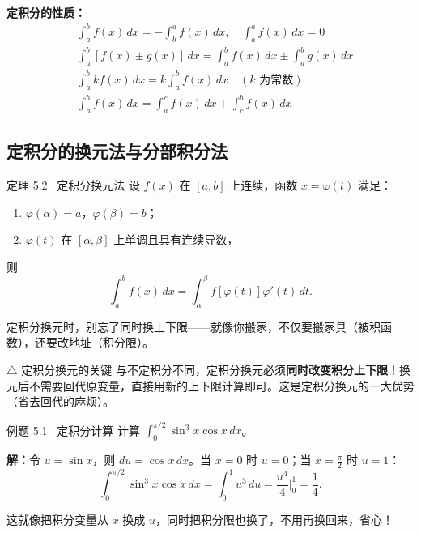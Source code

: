 \documentclass[12pt,a4paper]{article}
\newcommand{\redtext}[1]{{\color{MainRed}\textbf{#1}}}
\newcommand{\humor}[1]{\par\smallskip\begin{humorbox}#1\end{humorbox}\smallskip}
\begin{document}
\begin{formulaframe}
\centering
\textbf{定积分的性质：}
\[
\begin{aligned}
&\int_a^b f(x)\,dx = -\int_b^a f(x)\,dx, \quad \int_a^a f(x)\,dx = 0 \\[6pt]
&\int_a^b [f(x) \pm g(x)]\,dx = \int_a^b f(x)\,dx \pm \int_a^b g(x)\,dx \\[6pt]
&\int_a^b kf(x)\,dx = k\int_a^b f(x)\,dx \quad (k\text{ 为常数}) \\[6pt]
&\int_a^b f(x)\,dx = \int_a^c f(x)\,dx + \int_c^b f(x)\,dx
\end{aligned}
\]
\end{formulaframe}

\subsection{定积分的换元法与分部积分法}

\begin{thmbox}{定理 5.2 \ 定积分换元法}
设 $f(x)$ 在 $[a,b]$ 上连续，函数 $x = \varphi(t)$ 满足：
\begin{enumerate}[leftmargin=2em, itemsep=2pt]
  \item $\varphi(\alpha) = a$，$\varphi(\beta) = b$；
  \item $\varphi(t)$ 在 $[\alpha, \beta]$ 上单调且具有连续导数，
\end{enumerate}
则
\[
\int_a^b f(x)\,dx = \int_\alpha^\beta f[\varphi(t)]\varphi'(t)\,dt.
\]
\end{thmbox}
\humor{定积分换元时，别忘了同时换上下限——就像你搬家，不仅要搬家具（被积函数），还要改地址（积分限）。}

\begin{warnbox}{$\triangle$ 定积分换元的关键}
与不定积分不同，定积分换元必须\redtext{同时改变积分上下限}！换元后不需要回代原变量，直接用新的上下限计算即可。这是定积分换元的一大优势（省去回代的麻烦）。
\end{warnbox}

\begin{exbox}{例题 5.1 \ 定积分计算}
计算 $\displaystyle\int_0^{\pi/2} \sin^3 x \cos x\,dx$。

\sffamily\textbf{解：}\normalfont 令 $u = \sin x$，则 $du = \cos x\,dx$。当 $x = 0$ 时 $u = 0$；当 $x = \frac{\pi}{2}$ 时 $u = 1$：
\[
\int_0^{\pi/2} \sin^3 x \cos x\,dx = \int_0^1 u^3\,du = \frac{u^4}{4}\bigg|_0^1 = \frac{1}{4}.
\]
\end{exbox}
\humor{这就像把积分变量从 $x$ 换成 $u$，同时把积分限也换了，不用再换回来，省心！}
\end{document}
